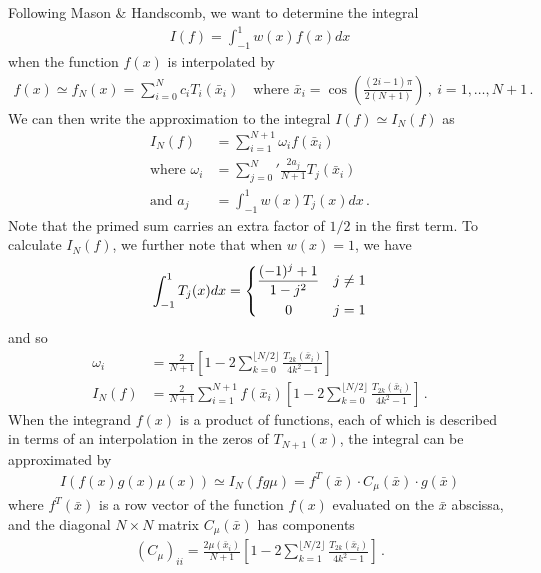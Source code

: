 \documentclass[11pt,letterpaper]{article}
\newcommand{\floor}[1]{\lfloor#1\rfloor}
\begin{document}
Following Mason \& Handscomb, we want to determine the integral
\begin{align}
	I(f) = \int^1_{-1}w(x)f(x) dx
\end{align}
when the function $f(x)$ is interpolated by
\begin{align}
	f(x) \simeq f_N(x) = \sum^N_{i=0} c_i T_i(\bar x_i) \quad \text{where } \bar x_i = \cos \left( \frac{(2i-1)\pi}{2(N+1)}\right)\, , \: i = 1,\ldots,N+1 \, .
\end{align}
We can then write the approximation to the integral $I(f) \simeq I_N(f)$ as
\begin{align}
	I_N(f) &= \sum_{i=1}^{N+1} \omega_i f(\bar x_i) \\
	\text{where } \omega_i &= \sum_{j=0}^N{}' \frac{2 a_j}{N+1} T_j(\bar x_i) \\
	\text{and } a_j &= \int^1_{-1} w(x) T_j(x) dx \, .
\end{align}
Note that the primed sum carries an extra factor of $1/2$ in the first term. To calculate $I_N(f)$, we further note that when $w(x) = 1$, we have
\begin{align}
	\int^1_{-1} T_j(x) dx = \begin{dcases}
		\frac{(-1)^j + 1}{1 - j^2} & j \neq 1 \\
		\qquad 0 & j = 1
	\end{dcases}
\end{align}
and so
\begin{align}
	\omega_i &= \frac{2}{N+1}\left[1 - 2 \sum_{k=0}^{\floor{N/2}} \frac{T_{2k}(\bar x_i)}{4k^2 - 1} \right] \\
	I_N(f) &= \frac{2}{N+1}\sum_{i=1}^{N+1} f(\bar x_i) \left[ 1 - 2 \sum_{k=0}^{\floor{N/2}} \frac{T_{2k}(\bar x_i)}{4k^2 - 1} \right]\, .
\end{align}
When the integrand $f(x)$ is a product of functions, each of which is described in terms of an interpolation in the zeros of $T_{N+1}(x)$, the integral can be approximated by
\begin{align}
	I(f(x)g(x)\mu(x)) \simeq I_N(fg\mu) = f^T(\bar x) \cdot C_\mu(\bar x) \cdot g(\bar x)
\end{align}  
where $f^T(\bar x)$ is a row vector of the function $f(x)$ evaluated on the $\bar x$ abscissa, and the diagonal ${N\times N}$ matrix $C_\mu (\bar x)$ has components
\begin{align}
	(C_\mu)_{ii} = \frac{2 \mu(\bar x_i)}{N + 1} \left[ 1 - 2\sum_{k=1}^{\floor{N/2}} \frac{T_{2k}(\bar x_i)}{4k^2 - 1}\right] \, .
\end{align}
\end{document}
